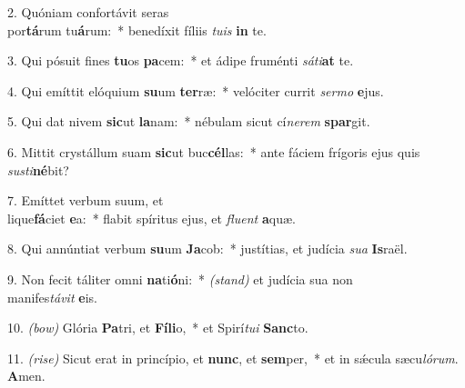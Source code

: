 2. Quóniam confortávit seras\\ por\textbf{tá}rum tu\textbf{á}rum:~* 
	benedíxit fíliis \textit{tu}\textit{is} \textbf{in} te.

3. Qui pósuit fines \textbf{tu}os \textbf{pa}cem:~* 
	et ádipe fruménti \textit{sá}\textit{ti}\textbf{at} te.

4. Qui emíttit elóquium \textbf{su}um \textbf{ter}ræ:~* 
	velóciter currit \textit{ser}\textit{mo} \textbf{e}jus.

5. Qui dat nivem \textbf{sic}ut \textbf{la}nam:~* 
	nébulam sicut cí\textit{ne}\textit{rem} \textbf{spar}git.

6. Mittit crystállum suam \textbf{sic}ut buc\textbf{cél}las:~* 
	ante fáciem frígoris ejus quis \textit{sus}\textit{ti}\textbf{né}bit?

7. Emíttet verbum suum, et\\ lique\textbf{fá}ciet \textbf{e}a:~* 
	flabit spíritus ejus, et \textit{flu}\textit{ent} \textbf{a}quæ.

8. Qui annúntiat verbum \textbf{su}um \textbf{Ja}cob:~* 
	justítias, et judícia \textit{su}\textit{a} \textbf{Is}raël.

9. Non fecit táliter omni \textbf{na}ti\textbf{ó}ni:~* 
	{\color{red}\textit{(stand)}} et judícia sua non\\ manifes\textit{tá}\textit{vit} \textbf{e}is.

10. {\color{red}\textit{(bow)}} Glória \textbf{Pa}tri, et \textbf{Fí}\textbf{li}o,~* 
	et Spirí\textit{tu}\textit{i} \textbf{Sanc}to.

11. {\color{red}\textit{(rise)}} Sicut erat in princípio, et \textbf{nunc}, et \textbf{sem}per,~* 
	et in s\'{\ae}cula sæcu\textit{ló}\textit{rum}. \textbf{A}men.


